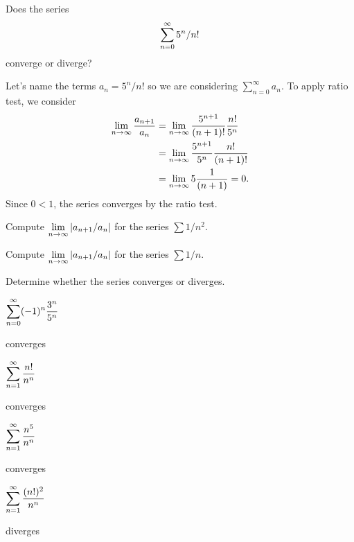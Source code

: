 
\begin{example} 
Does the series 
$$
\displaystyle\sum_{n=0}^\infty  5^n/n!
$$
converge or diverge?
\end{example}


\begin{solution}
Let's name the terms $a_n = 5^n / n!$ so we are considering $\sum_{n=0}^\infty a_n$.  To apply ratio test, we consider
\begin{align*}
  \lim_{n\to\infty} \frac{a_{n+1}}{a_n}
  &= \lim_{n\to\infty} {5^{n+1}\over (n+1)!}{n!\over 5^n} \\
  &= \lim_{n\to\infty} {5^{n+1}\over 5^n}{n!\over (n+1)!} \\
  &= \lim_{n\to\infty} {5}{1\over (n+1)}=0.
\end{align*}
Since $0<1$, the series converges by the ratio test.
\end{solution}

\begin{exercises}

\begin{exercise} Compute $\displaystyle\lim_{n\to\infty} |a_{n+1}/a_n|$ for the series
$\sum 1/n^2$.
\end{exercise}

\begin{exercise} Compute $\displaystyle\lim_{n\to\infty} |a_{n+1}/a_n|$ for the series
$\sum 1/n$.
\end{exercise}

Determine whether the series converges or diverges.

\begin{exercise} $\displaystyle\sum_{n=0}^\infty (-1)^{n}{3^n\over 5^n}$
\begin{answer} converges
\end{answer}\end{exercise}

\begin{exercise} $\displaystyle\sum_{n=1}^\infty {n!\over n^n}$
\begin{answer} converges
\end{answer}\end{exercise}

\begin{exercise} $\displaystyle\sum_{n=1}^\infty {n^5\over n^n}$
\begin{answer} converges
\end{answer}\end{exercise}

\begin{exercise} $\displaystyle\sum_{n=1}^\infty {(n!)^2\over n^n}$
\begin{answer} diverges
\end{answer}\end{exercise}

\end{exercises}
